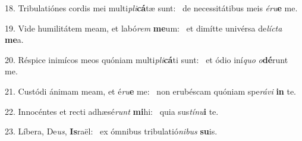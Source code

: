 18. Tribulatiónes cordis mei multi\textit{pli}\textbf{cá}tæ sunt: \ast\  de necessitátibus meis \textit{é}\textit{ru}\textbf{e} me.\

19. Vide humilitátem meam, et labó\textit{rem} \textbf{me}um: \ast\  et dimítte univérsa de\textit{líc}\textit{ta} \textbf{me}a.\

20. Réspice inimícos meos quóniam multi\textit{pli}\textbf{cá}ti sunt: \ast\  et ódio iní\textit{quo} \textit{o}\textbf{dé}runt me.\

21. Custódi ánimam meam, et é\textit{ru}\textbf{e} me: \ast\  non erubéscam quóniam spe\textit{rá}\textit{vi} \textbf{in} te.\

22. Innocéntes et recti adhæsé\textit{runt} \textbf{mi}hi: \ast\  quia sus\textit{tí}\textit{nu}\textbf{i} te.\

23. Líbera, De\textit{us}, \textbf{Is}raël: \ast\  ex ómnibus tribulatió\textit{ni}\textit{bus} \textbf{su}is.\

